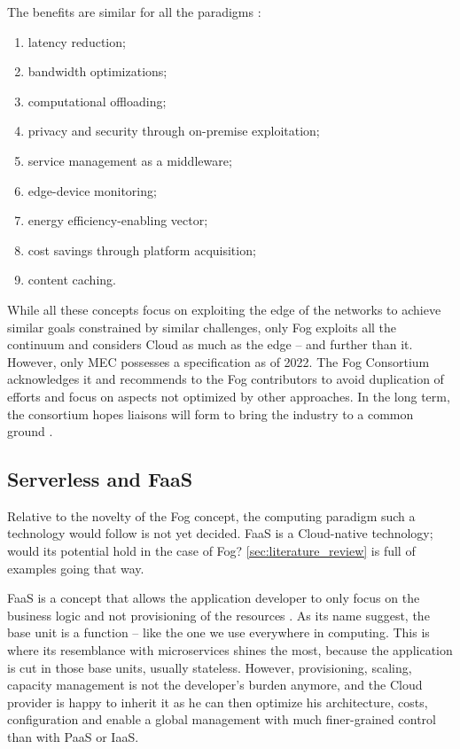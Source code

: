 The benefits are similar for all the paradigms \cite{ahmed_fog_2019, ai_edge_2018}:
\begin{enumerate}[(1)]
	\item latency reduction;
	\item bandwidth optimizations;
	\item computational offloading;
	\item privacy and security through on-premise exploitation;
	\item service management as a middleware;
	\item edge-device monitoring;
	\item energy efficiency-enabling vector;
	\item cost savings through platform acquisition;
	\item content caching.
\end{enumerate}

While all these concepts focus on exploiting the edge of the networks to achieve similar goals constrained by similar challenges, only Fog exploits all the continuum and considers Cloud as much as the edge -- and further than it. However, only \gls{MEC} possesses a specification as of 2022. The Fog Consortium acknowledges it and recommends to the Fog contributors to avoid duplication of efforts and focus on aspects not optimized by other approaches. In the long term, the consortium hopes liaisons will form to bring the industry to a common ground \cite{ieee_standards_association_ieee_2018}.

\hypersetup{linkcolor=}
\subsection{Serverless and \acrfull{FaaS}}

Relative to the novelty of the Fog concept, the computing paradigm such a technology would follow is not yet decided. \gls{FaaS} is a Cloud-native technology; would its potential hold in the case of Fog? \cref{sec:literature_review} is full of examples going that way.

\gls{FaaS} is a concept that allows the application developer to only focus on the business logic and not provisioning of the resources \cite{redhat_what_2020}. As its name suggest, the base unit is a function -- like the one we use everywhere in computing. This is where its resemblance with microservices shines the most, because the application is cut in those base units, usually stateless. However, provisioning, scaling, capacity management is not the developer's burden anymore, and the Cloud provider is happy to inherit it as he can then optimize his architecture, costs, configuration and enable a global management with much finer-grained control than with \gls{PaaS} or \gls{IaaS}.


